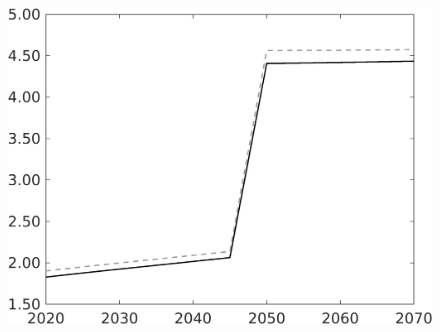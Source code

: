 \begin{figure}[h!!!]
\begin{minipage}[]{0.32\textwidth}
	\end{minipage}
	\begin{minipage}[]{0.32\textwidth}
		\includegraphics[width=1\textwidth]{../../codding_model/own_basedOnFried/optimalPol_010922_revision/figures/all_13Sept22_Tplus30/tauf_OPT_COMPtaul_regime0_spillover0_knspil1_noskill0_sep0_xgrowth0_PV1_etaa0.79_lgd0.png}
	\end{minipage}
\end{figure} 
